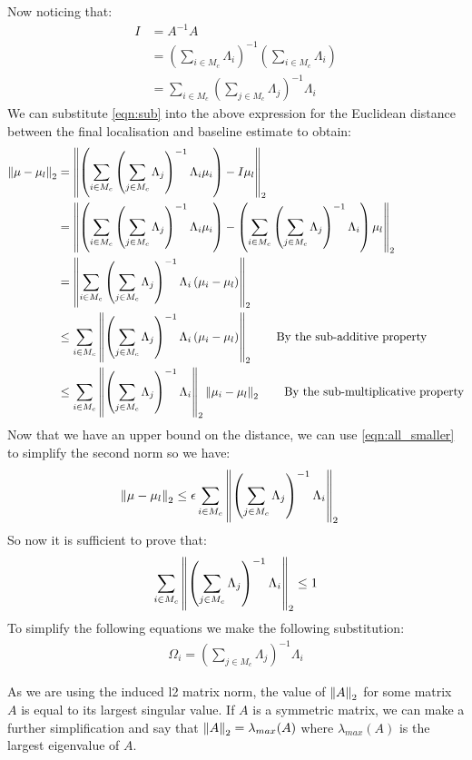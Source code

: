 Now noticing that:
\begin{align}
    I &= A^{-1}A\\
      &= \left(\sum_{i \in M_c} \Lambda_i\right)^{-1}\left(\sum_{i \in M_c} \Lambda_i\right)\\
      &= \sum_{i \in M_c} \left(\sum_{j \in M_c} \Lambda_j\right)^{-1}\Lambda_i \label{eqn:sub}
\end{align}
We can substitute \autoref{eqn:sub} into the above expression for the Euclidean distance between the final localisation and baseline estimate to obtain:
\begin{align}
    \left\lVert\mu - \mu_l\right\rVert_2 &= \left\lVert\left(\sum_{i \in M_c} \left(\sum_{j \in M_c} \Lambda_j\right)^{-1} \Lambda_i\mu_i\right)  - I\mu_l\right\rVert_2\\
    &= \left\lVert\left(\sum_{i \in M_c} \left(\sum_{j \in M_c} \Lambda_j\right)^{-1} \Lambda_i\mu_i\right)  - \left(\sum_{i \in M_c} \left(\sum_{j \in M_c} \Lambda_j\right)^{-1}\Lambda_i\right)\mu_l\right\rVert_2\\
     &= \left\lVert\sum_{i \in M_c} \left(\sum_{j \in M_c} \Lambda_j\right)^{-1} \Lambda_i\left(\mu_i - \mu_l\right)\right\rVert_2\\
     &\leq \sum_{i \in M_c} \left\lVert\left(\sum_{j \in M_c} \Lambda_j\right)^{-1} \Lambda_i\left(\mu_i - \mu_l\right)\right\rVert_2 \tag*{By the sub-additive property}\\
     &\leq \sum_{i \in M_c} \left\lVert\left(\sum_{j \in M_c} \Lambda_j\right)^{-1} \Lambda_i\right\rVert_2\left\lVert\mu_i - \mu_l\right\rVert_2 \tag*{By the sub-multiplicative property}
\end{align}
Now that we have an upper bound on the distance, we can use \autoref{eqn:all_smaller} to simplify the second norm so we have:
\begin{align}
    \left\lVert\mu - \mu_l\right\rVert_2 &\leq \epsilon\sum_{i \in M_c} \left\lVert\left(\sum_{j \in M_c} \Lambda_j\right)^{-1} \Lambda_i\right\rVert_2
\end{align}
So now it is sufficient to prove that:
\begin{align}
    \sum_{i \in M_c} \left\lVert\left(\sum_{j \in M_c} \Lambda_j\right)^{-1} \Lambda_i\right\rVert_2 \leq 1
\end{align}
To simplify the following equations we make the following substitution:
\begin{align}
    \Omega_i = \left(\sum_{j \in M_c} \Lambda_j\right)^{-1} \Lambda_i
\end{align}

As we are using the induced l2 matrix norm, the value of $\left\lVert A\right\rVert_2$ for some matrix $A$ is equal to its largest singular value. If $A$ is a symmetric matrix, we can make a further simplification and say that $\left\lVert A\right\rVert_2 = \lambda_{max}(A)$ where $\lambda_{max}(A)$ is the largest eigenvalue of $A$.

